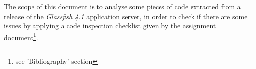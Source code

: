 The scope of this document is to analyse some pieces of code extracted from a release of the \textit{Glassfish 4.1} application server, in order to check if there are some issues by applying a code inspection checklist given by the assignment document\footnote{see 'Bibliography' section}.